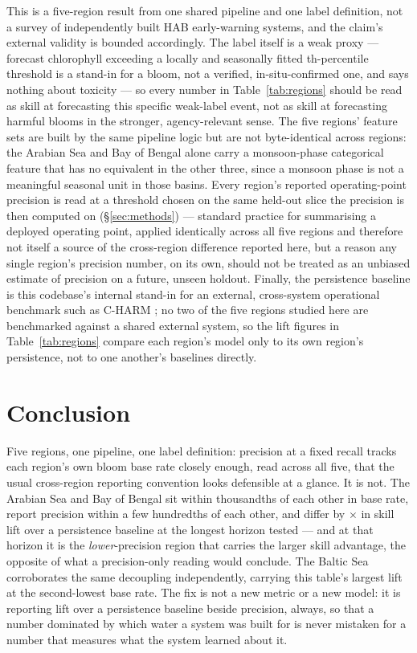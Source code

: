 This is a five-region result from one shared pipeline and one label
definition, not a survey of independently built HAB early-warning systems,
and the claim's external validity is bounded accordingly. The label itself
is a weak proxy --- forecast chlorophyll exceeding a locally and seasonally
fitted \HabPercentile{}th-percentile threshold is a stand-in for a bloom, not
a verified, in-situ-confirmed one, and says nothing about toxicity --- so
every number in Table~\ref{tab:regions} should be read as skill at
forecasting this specific weak-label event, not as skill at forecasting
harmful blooms in the stronger, agency-relevant sense. The five regions'
feature sets are built by the same pipeline logic but are not byte-identical
across regions: the Arabian Sea and Bay of Bengal alone carry a
monsoon-phase categorical feature that has no equivalent in the other three,
since a monsoon phase is not a meaningful seasonal unit in those basins.
Every region's reported operating-point precision is read at a threshold
chosen on the same held-out slice the precision is then computed on
(\S\ref{sec:methods}) --- standard practice for summarising a deployed
operating point, applied identically across all five regions and therefore
not itself a source of the cross-region difference reported here, but a
reason any single region's precision number, on its own, should not be
treated as an unbiased estimate of precision on a future, unseen holdout.
Finally, the persistence baseline is this codebase's internal stand-in for
an external, cross-system operational benchmark such as C-HARM
\citep{charm2016}; no two of the five regions studied here are benchmarked
against a shared external system, so the lift figures in
Table~\ref{tab:regions} compare each region's model only to its own
region's persistence, not to one another's baselines directly.

\section{Conclusion}

Five regions, one pipeline, one label definition: precision at a fixed
recall tracks each region's own bloom base rate closely enough, read across
all five, that the usual cross-region reporting convention looks defensible
at a glance. It is not. The Arabian Sea and Bay of Bengal sit within
thousandths of each other in base rate, report precision within a few
hundredths of each other, and differ by \HabLiftRatioSeven{}$\times$ in
skill lift over a persistence baseline at the longest horizon tested ---
and at that horizon it is the \emph{lower}-precision region that carries the
larger skill advantage, the opposite of what a precision-only reading would
conclude. The Baltic Sea corroborates the same decoupling independently,
carrying this table's largest lift at the second-lowest base rate. The fix
is not a new metric or a new model: it is reporting lift over a persistence
baseline beside precision, always, so that a number dominated by which water
a system was built for is never mistaken for a number that measures what
the system learned about it.
